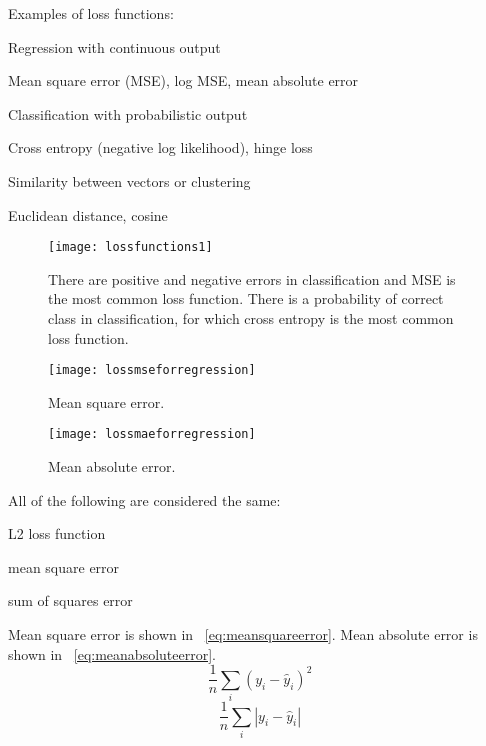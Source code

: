Examples of loss functions:
	\begin{bulletedlist}
		\item Regression with continuous output
		\begin{bulletedlist}
			\item Mean square error (MSE), log MSE, mean absolute error
		\end{bulletedlist}
		\item Classification with probabilistic output
		\begin{bulletedlist}
			\item Cross entropy (negative log likelihood), hinge loss
		\end{bulletedlist}
		\item Similarity between vectors or clustering
		\begin{bulletedlist}
			\item Euclidean distance, cosine
		\end{bulletedlist}
	\end{bulletedlist}

 	\begin{figure}[h]
		\centering
		\texttt{[image: lossfunctions1]}
		\caption{There are positive and negative errors in classification and MSE is the most common loss function.  There is a probability of correct class
in classification, for which cross entropy is the most common loss function.}
		\label{fig:lossfunctions1}
	\end{figure}
 	\begin{figure}[h]
		\centering
		\texttt{[image: lossmseforregression]}
		\caption{Mean square error.}
		\label{fig:lossmseforregression}
	\end{figure}
 	\begin{figure}[h]
		\centering
		\texttt{[image: lossmaeforregression]}
		\caption{Mean absolute error.}
		\label{fig:lossmaeforregression}
	\end{figure}


All of the following are considered the same:
	\begin{bulletedlist}
		\item L2 loss function
		\item mean square error
		\item sum of squares error
	\end{bulletedlist}

Mean square error is shown in \equationname~\ref{eq:meansquareerror}.  Mean absolute error is shown in \equationname~\ref{eq:meanabsoluteerror}.
	\begin{equation}
		\frac{1}{n} \sum_i \left( y_i - \hat{y}_i \right)^2
		\label{eq:meansquareerror}
	\end{equation}
	\begin{equation}
		\frac{1}{n} \sum_i \left| y_i - \hat{y}_i \right|
		\label{eq:meanabsoluteerror}
	\end{equation}	
	\begin{mathwhere}
	\end{mathwhere}

